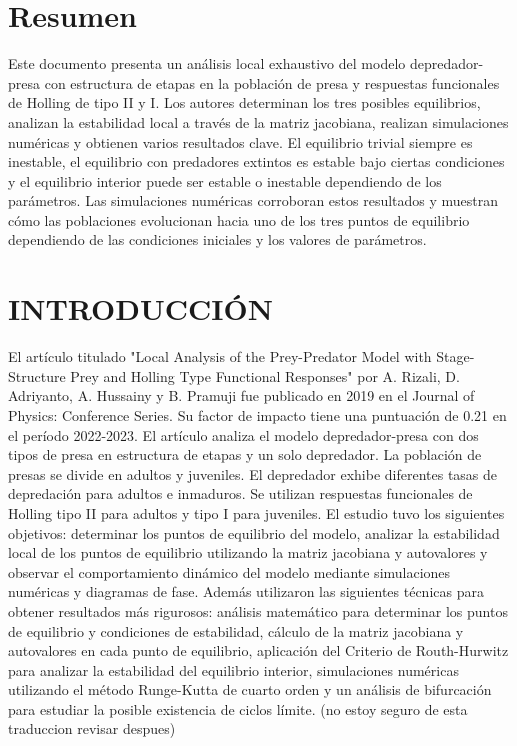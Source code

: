 \documentclass{wscpaperproc}
\theoremstyle{wsc}
\begin{document}
\maketitle

\section*{Resumen}
Este documento presenta un análisis local exhaustivo del modelo depredador-presa con estructura de
etapas en la población de presa y respuestas funcionales de Holling de tipo II y I. Los autores determinan
los tres posibles equilibrios, analizan la estabilidad local a través de la matriz jacobiana, realizan
simulaciones numéricas y obtienen varios resultados clave. El equilibrio trivial siempre es inestable,
el equilibrio con predadores extintos es estable bajo ciertas condiciones y el equilibrio interior puede
ser estable o inestable dependiendo de los parámetros. Las simulaciones numéricas corroboran estos resultados
y muestran cómo las poblaciones evolucionan hacia uno de los tres puntos de equilibrio dependiendo de las
condiciones iniciales y los valores de parámetros.

\section{INTRODUCCI\'ON}
\label{sec:intro}
El artículo titulado "Local Analysis of the Prey-Predator Model with Stage-Structure Prey and Holling \cite{holling_functional_1965}
Type Functional Responses" por A. Rizali, D. Adriyanto, A. Hussainy y B. Pramuji fue publicado en 2019
en el Journal of Physics: Conference Series. Su factor de impacto tiene una puntuaci\'on de 0.21 en el
período 2022-2023. El artículo analiza el modelo depredador-presa con dos tipos de presa en estructura
de etapas y un solo depredador. La población de presas se divide en adultos y juveniles. El depredador
exhibe diferentes tasas de depredación para adultos e inmaduros. Se utilizan respuestas funcionales de
Holling tipo II \cite{holling_functional_1965}para adultos y tipo I para juveniles. El estudio tuvo los siguientes objetivos:
determinar los puntos de equilibrio del modelo, analizar la estabilidad local de los puntos de equilibrio
utilizando la matriz jacobiana y autovalores y observar el comportamiento dinámico del modelo mediante
simulaciones numéricas y diagramas de fase. Además utilizaron las siguientes técnicas para obtener resultados
más rigurosos: análisis matemático para determinar los puntos de equilibrio y condiciones de estabilidad,
cálculo de la matriz jacobiana y autovalores en cada punto de equilibrio, aplicación del Criterio de Routh-Hurwitz
para analizar la estabilidad del equilibrio interior, simulaciones numéricas utilizando el método Runge-Kutta de
cuarto orden y un análisis de bifurcación para estudiar la posible existencia de ciclos límite. (no estoy seguro de esta traduccion revisar despues)
\end{document}
